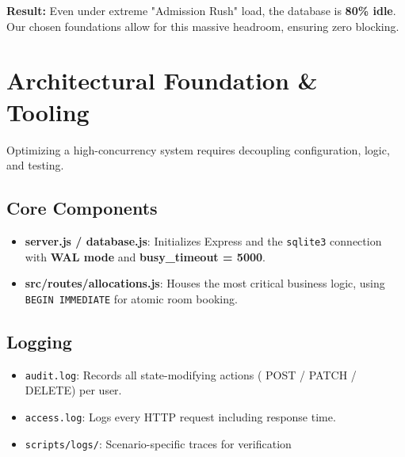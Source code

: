 \documentclass[sigconf]{acmart}
\begin{document}
\textbf{Result:} Even under extreme "Admission Rush" load, the database is \textbf{80\% idle}. Our chosen foundations allow for this massive headroom, ensuring zero blocking.
\section{Architectural Foundation \& Tooling}

Optimizing a high-concurrency system requires decoupling configuration, logic, and testing.

\subsection{Core Components}
\begin{itemize}[leftmargin=*]
    \item \textbf{server.js / database.js}: Initializes Express and the \texttt{sqlite3} connection with \textbf{WAL mode} and \textbf{busy\_timeout = 5000}.
    \item \textbf{src/routes/allocations.js}: Houses the most critical business logic, using \texttt{BEGIN IMMEDIATE} for atomic room booking.
\end{itemize}

\subsection{Logging}
\begin{itemize}[leftmargin=*]
    \item \texttt{audit.log}: Records all state-modifying actions ( POST / PATCH / DELETE) per user.
    \item \texttt{access.log}: Logs every HTTP request including response time.
    \item \texttt{scripts/logs/}: Scenario-specific traces for verification
\end{itemize}
\end{document}
